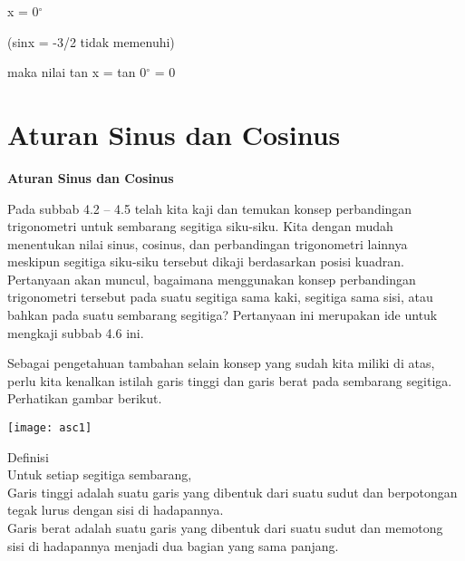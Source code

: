 \documentclass[11pt,fleqn]{book} %
\begin{document}
\begin{myEnumerate}
\begin{itemize}
\noindent x = 0${}^\circ$

\noindent (sinx = -3/2 tidak memenuhi)

\noindent maka nilai tan x = tan 0${}^\circ$ = 0

\noindent 

\noindent \textbf{}

\noindent 

\section{Aturan Sinus dan Cosinus}





\noindent \textbf{Aturan Sinus dan Cosinus}

Pada subbab 4.2 -- 4.5 telah kita kaji dan temukan konsep perbandingan trigonometri untuk sembarang segitiga siku-siku. Kita dengan mudah menentukan nilai sinus, cosinus, dan perbandingan trigonometri lainnya meskipun segitiga siku-siku tersebut dikaji berdasarkan posisi kuadran. Pertanyaan akan muncul, bagaimana menggunakan konsep perbandingan trigonometri tersebut pada suatu segitiga sama kaki, segitiga sama sisi, atau bahkan pada suatu sembarang segitiga? Pertanyaan ini merupakan ide untuk mengkaji subbab 4.6 ini.

Sebagai pengetahuan tambahan selain konsep yang sudah kita miliki di atas, perlu kita kenalkan istilah garis tinggi dan garis berat pada sembarang segitiga. Perhatikan gambar berikut.

\texttt{[image: asc1]}



\noindent 

Definisi\\

Untuk setiap segitiga sembarang,\\

Garis tinggi adalah suatu garis yang dibentuk dari suatu sudut dan
berpotongan tegak lurus dengan sisi di hadapannya.\\

Garis berat adalah suatu garis yang dibentuk dari suatu sudut dan memotong
sisi di hadapannya menjadi dua bagian yang sama panjang.


\noindent \eject 


\end{itemize}
\end{myEnumerate}
\end{document}
